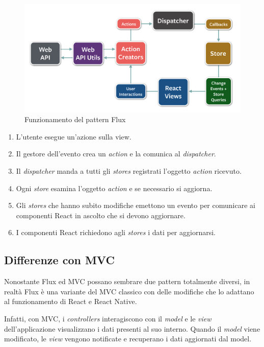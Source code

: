 \begin{figure}[htp]
\centering
\includegraphics[width=\textwidth*3/4]{../immagini/flux-diagram}
\caption{Funzionamento del pattern Flux}  
\end{figure}
\FloatBarrier

\begin{enumerate}
\item L'utente esegue un'azione sulla view.
\item Il gestore dell'evento crea un \textit{action} e la comunica al \textit{dispatcher}.
\item Il \textit{dispatcher} manda a tutti gli \textit{stores} registrati l'oggetto \textit{action} ricevuto.
\item Ogni \textit{store} esamina l'oggetto  \textit{action} e se necessario si aggiorna. 
\item Gli \textit{stores} che hanno subito modifiche emettono un evento per comunicare ai componenti React in ascolto che si devono aggiornare.
\item I componenti React richiedono agli \textit{stores} i dati per aggiornarsi.
\end{enumerate}

\subsection{Differenze con MVC}

Nonostante Flux ed MVC possano sembrare due pattern totalmente diversi, in realtà Flux è una variante del MVC classico con delle modifiche che lo adattano al funzionamento di React e React Native.

Infatti, con MVC, i \textit{controllers} interagiscono con il \textit{model} e le \textit{view} dell'applicazione visualizzano i dati presenti al suo interno.
Quando il \textit{model} viene modificato, le \textit{view} vengono notificate e recuperano i dati aggiornati dal model.

